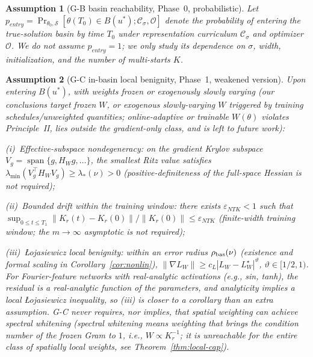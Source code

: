 \documentclass[11pt]{article}
\newcommand{\W}{W}
\DeclareMathOperator{\spanop}{span}
\newtheorem{assumption}{Assumption}[section]
\numberwithin{equation}{section}
\begin{document}
\begin{assumption}[G-B basin reachability, Phase~0, probabilistic]\label{ass:GB}
Let $p_{entry}=\Pr_{\theta_0,\mathcal S}[\theta(T_0)\in B(u^*);\mathcal C_\sigma,\mathcal O]$ denote the probability of entering the true-solution basin by time $T_0$ under representation curriculum $\mathcal C_\sigma$ and optimizer $\mathcal O$. We do not assume $p_{entry}=1$; we only study its dependence on $\sigma$, width, initialization, and the number of multi-starts $K$.
\end{assumption}

\begin{assumption}[G-C in-basin local benignity, Phase~1, weakened version]\label{ass:GC}
Upon entering $B(u^*)$, with weights frozen or \emph{exogenously slowly varying} (our conclusions target frozen $\W$, or exogenous slowly-varying $\W$ triggered by training schedules/unweighted quantities; online-adaptive or trainable $\W(\theta)$ violates Principle~II, lies outside the gradient-only class, and is left to future work):
\par(i)~\emph{Effective-subspace nondegeneracy}: on the gradient Krylov subspace $V_g=\spanop\{g,H_{\W}g,\ldots\}$, the smallest Ritz value satisfies $\lambda_{\min}(V_g^\top H_{\W}V_g)\ge\lambda_*(\nu)>0$ (positive-definiteness of the full-space Hessian is not required);
\par(ii)~\emph{Bounded drift within the training window}: there exists $\varepsilon_{NTK}<1$ such that $\sup_{0\le t\le T_1}\|K_r(t)-K_r(0)\|/\|K_r(0)\|\le\varepsilon_{NTK}$ (finite-width training window; the $m\to\infty$ asymptotic is not required);
\par(iii)~\emph{{\L}ojasiewicz local benignity}: within an error radius $\rho_{\rm bas}(\nu)$ (existence and formal scaling in Corollary~\ref{cor:nonlin}), $\|\nabla L_{\W}\|\ge c_L|L_{\W}-L_{\W}^\star|^\vartheta$, $\vartheta\in[1/2,1)$. For Fourier-feature networks with real-analytic activations (e.g., sin, tanh), the residual is a real-analytic function of the parameters, and analyticity \emph{implies} a local {\L}ojasiewicz inequality, so (iii) is closer to a corollary than an extra assumption.
\emph{G-C never requires, nor implies, that spatial weighting can achieve spectral whitening} (spectral whitening means weighting that brings the condition number of the frozen Gram to $1$, i.e., $\W\propto K_r^{-1}$; it is unreachable for the entire class of spatially local weights, see Theorem~\ref{thm:local-cap}).
\end{assumption}
\end{document}

